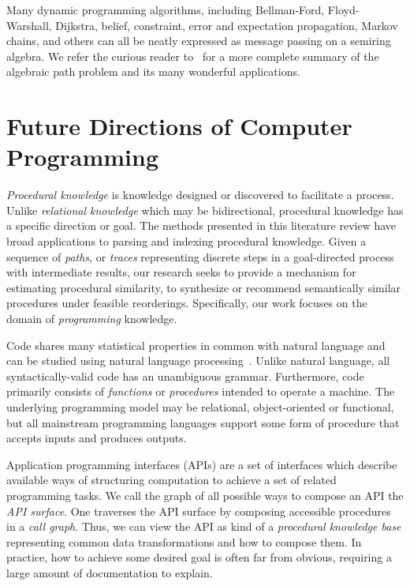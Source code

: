 \documentclass[10pt]{article}
\begin{document}
  \noindent Many dynamic programming algorithms, including Bellman-Ford, Floyd-Warshall, Dijkstra, belief, constraint, error and expectation propagation, Markov chains, and others can all be neatly expressed as message passing on a semiring algebra. We refer the curious reader to~\cite{gondran2008graphs,baras2010path} for a more complete summary of the algebraic path problem and its many wonderful applications.


\noindent\section{Future Directions of Computer Programming}

\textit{Procedural knowledge} is knowledge designed or discovered to facilitate a process. Unlike \textit{relational knowledge} which may be bidirectional, procedural knowledge has a specific direction or goal. The methods presented in this literature review have broad applications to parsing and indexing procedural knowledge. Given a sequence of \textit{paths}, or \textit{traces} representing discrete steps in a goal-directed process with intermediate results, our research seeks to provide a mechanism for estimating procedural similarity, to synthesize or recommend semantically similar procedures under feasible reorderings. Specifically, our work focuses on the domain of \textit{programming} knowledge.

Code shares many statistical properties in common with natural language and can be studied using natural language processing~\cite{hindle2012naturalness}. Unlike natural language, all syntactically-valid code has an unambiguous grammar. Furthermore, code primarily consists of \textit{functions} or \textit{procedures} intended to operate a machine. The underlying programming model may be relational, object-oriented or functional, but all mainstream programming languages support some form of procedure that accepts inputs and produces outputs.


Application programming interfaces (APIs) are a set of interfaces which describe available ways of structuring computation to achieve a set of related programming tasks. We call the graph of all possible ways to compose an API the \textit{API surface}. One traverses the API surface by composing accessible procedures in a \textit{call graph}. Thus, we can view the API as kind of a \textit{procedural knowledge base} representing common data transformations and how to compose them. In practice, how to achieve some desired goal is often far from obvious, requiring a large amount of documentation to explain.
\end{document}
